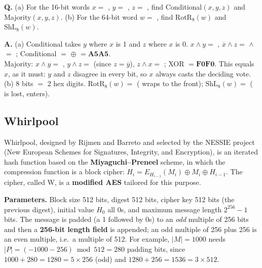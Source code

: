 \begin{worked}
\textbf{Q.} (a) For the 16-bit words $x = $ , $y = $ , $z = $ , find Conditional$(x, y, z)$ and Majority$(x, y, z)$. (b) For the 64-bit word $w = $ , find $\mathrm{RotR}_8(w)$ and $\mathrm{ShL}_8(w)$.

\textbf{A.} (a) Conditional takes $y$ where $x$ is 1 and $z$ where $x$ is 0. $x \wedge y = $ , $\overline x \wedge z = $  $\wedge$  $= $ ; Conditional $= $  $\oplus$  $= \mathbf{A5A5}$.\\
Majority: $x \wedge y = $ , $y \wedge z = $  (since $z = \overline y$), $z \wedge x = $ ; XOR $= \mathbf{F0F0}$. This equals $x$, as it must: $y$ and $z$ disagree in every bit, so $x$ always casts the deciding vote.\\
(b) 8 bits $=$ 2 hex digits. $\mathrm{RotR}_8(w) = $  ( wraps to the front); $\mathrm{ShL}_8(w) = $  ( is lost,  enters).
\end{worked}

\subsection{Whirlpool}
Whirlpool, designed by Rijmen and Barreto and selected by the NESSIE project (New European Schemes for Signatures, Integrity, and Encryption), is an iterated hash function based on the \textbf{Miyaguchi--Preneel} scheme, in which the compression function is a block cipher: $H_i = E_{H_{i-1}}(M_i) \oplus M_i \oplus H_{i-1}$. The cipher, called W, is a \textbf{modified AES} tailored for this purpose.

\textbf{Parameters.} Block size 512 bits, digest 512 bits, cipher key 512 bits (the previous digest), initial value $H_0$ all 0s, and maximum message length $2^{256} - 1$ bits. The message is padded (a 1 followed by 0s) to an \emph{odd} multiple of 256 bits and then a \textbf{256-bit length field} is appended; an odd multiple of 256 plus 256 is an even multiple, i.e.\ a multiple of 512. For example, $|M| = 1000$ needs $|P| = (-1000 - 256) \bmod 512 = 280$ padding bits, since $1000 + 280 = 1280 = 5 \times 256$ (odd) and $1280 + 256 = 1536 = 3 \times 512$.

